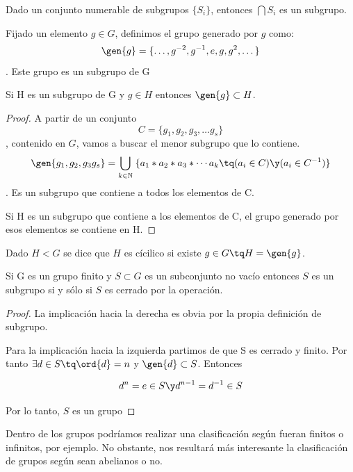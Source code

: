 \documentclass[nochap]{apuntes}
\begin{document}
  \begin{theorem}
   Dado un conjunto numerable de subgrupos $\{ S_i \}$, entonces $\bigcap S_i $ es un subgrupo.
  \end{theorem}

  
  \begin{defn}
   Fijado un elemento $g \in G$, definimos el grupo generado por $g$ como:
   \[ \gen{g} =\{\dotsc, g^{-2}, g^{-1}, e, g, g^{2},\dotsc \}\]. Este grupo es un subgrupo de G
  \end{defn}

  \begin{theorem}
   Si H es un subgrupo de G y $g\in H$ entonces $\gen{g}\subset H$.   
  \end{theorem}
\begin{proof}
  A partir de un conjunto \[ C=\{g_{1}, g_{2}, g_{3}, \dotsc g_{s} \}\], contenido en $G$, vamos a buscar el menor subgrupo que lo contiene.
  \[ \gen{g_{1}, g_{2}, g_{3}g_{s}} =\bigcup_{k\in\mathbb{N}}\; \{ a_{1} \ast a_{2}\ast a_{3} \ast \dotsb  a_{k} \tq (a_{i}\in C) \y (a_{i}\in C^{-1})\} \]. Es un subgrupo que contiene a  todos los elementos de C.
  
  Si H es un subgrupo que contiene a los elementos de C, el grupo generado por esos elementos se contiene en H.
  \end{proof}
  
  \begin{defn}
   Dado $H<G$ se dice que $H$ es cícilico si existe $g\in G \tq H=\gen{g}$.
  \end{defn}

  \begin{theorem}
   Si G es un grupo finito y $S\subset G$ es un subconjunto no vacío entonces $S$ es un subgrupo si y sólo si $S$ es cerrado por la operación.   
  \end{theorem}
  
  \begin{proof}
   La implicación hacia la derecha es obvia por la propia definición de subgrupo.
   
   Para la implicación hacia la izquierda partimos de que S es cerrado y finito. Por tanto $\exists d \in S \tq \ord{d}=n$ y $\gen{d} \subset S$. Entonces
   
\[ d^{n}=e\in S \y d^{n-1}=d^{-1}\in S\]

Por lo tanto, $S$ es un grupo
  \end{proof}

  Dentro de los grupos podríamos realizar una clasificación según fueran finitos o infinitos, por ejemplo. No obstante, nos resultará
  más interesante la clasificación de grupos según sean abelianos o no.
  
\end{document}
